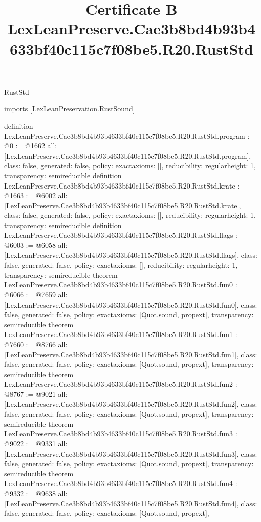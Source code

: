 \begin{lexlean}{RustStd}
\title{Certificate B LexLeanPreserve.Cae3b8bd4b93b4633bf40c115c7f08be5.R20.RustStd}
\begin{coremodule}
imports [LexLeanPreservation.RustSound]

definition LexLeanPreserve.Cae3b8bd4b93b4633bf40c115c7f08be5.R20.RustStd.program : @0 := @1662 {
  all: [LexLeanPreserve.Cae3b8bd4b93b4633bf40c115c7f08be5.R20.RustStd.program],
  class: false,
  generated: false,
  policy: exact{axioms: []},
  reducibility: regular{height: 1},
  transparency: semireducible
}
definition LexLeanPreserve.Cae3b8bd4b93b4633bf40c115c7f08be5.R20.RustStd.krate : @1663 := @6002 {
  all: [LexLeanPreserve.Cae3b8bd4b93b4633bf40c115c7f08be5.R20.RustStd.krate],
  class: false,
  generated: false,
  policy: exact{axioms: []},
  reducibility: regular{height: 1},
  transparency: semireducible
}
definition LexLeanPreserve.Cae3b8bd4b93b4633bf40c115c7f08be5.R20.RustStd.flags : @6003 := @6058 {
  all: [LexLeanPreserve.Cae3b8bd4b93b4633bf40c115c7f08be5.R20.RustStd.flags],
  class: false,
  generated: false,
  policy: exact{axioms: []},
  reducibility: regular{height: 1},
  transparency: semireducible
}
theorem LexLeanPreserve.Cae3b8bd4b93b4633bf40c115c7f08be5.R20.RustStd.fun0 : @6066 := @7659 {
  all: [LexLeanPreserve.Cae3b8bd4b93b4633bf40c115c7f08be5.R20.RustStd.fun0],
  class: false,
  generated: false,
  policy: exact{axioms: [Quot.sound, propext]},
  transparency: semireducible
}
theorem LexLeanPreserve.Cae3b8bd4b93b4633bf40c115c7f08be5.R20.RustStd.fun1 : @7660 := @8766 {
  all: [LexLeanPreserve.Cae3b8bd4b93b4633bf40c115c7f08be5.R20.RustStd.fun1],
  class: false,
  generated: false,
  policy: exact{axioms: [Quot.sound, propext]},
  transparency: semireducible
}
theorem LexLeanPreserve.Cae3b8bd4b93b4633bf40c115c7f08be5.R20.RustStd.fun2 : @8767 := @9021 {
  all: [LexLeanPreserve.Cae3b8bd4b93b4633bf40c115c7f08be5.R20.RustStd.fun2],
  class: false,
  generated: false,
  policy: exact{axioms: [Quot.sound, propext]},
  transparency: semireducible
}
theorem LexLeanPreserve.Cae3b8bd4b93b4633bf40c115c7f08be5.R20.RustStd.fun3 : @9022 := @9331 {
  all: [LexLeanPreserve.Cae3b8bd4b93b4633bf40c115c7f08be5.R20.RustStd.fun3],
  class: false,
  generated: false,
  policy: exact{axioms: [Quot.sound, propext]},
  transparency: semireducible
}
theorem LexLeanPreserve.Cae3b8bd4b93b4633bf40c115c7f08be5.R20.RustStd.fun4 : @9332 := @9638 {
  all: [LexLeanPreserve.Cae3b8bd4b93b4633bf40c115c7f08be5.R20.RustStd.fun4],
  class: false,
  generated: false,
  policy: exact{axioms: [Quot.sound, propext]},
}
\end{coremodule}
\end{lexlean}
